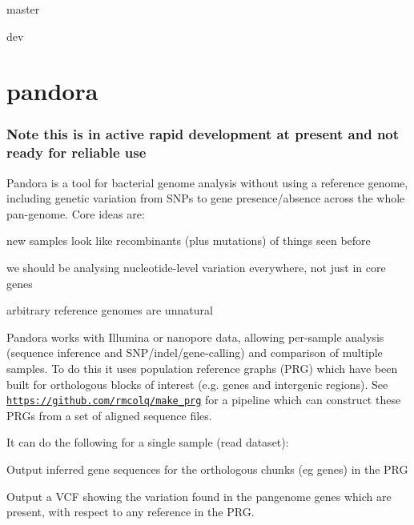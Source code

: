 \href{https://travis-ci.org/rmcolq/pandora}{\tt } master

\href{https://travis-ci.com/rmcolq/pandora}{\tt } dev

\href{https://singularity-hub.org/collections/1285}{\tt }

\section*{pandora}

\subsubsection*{Note this is in active rapid development at present and not ready for reliable use}

Pandora is a tool for bacterial genome analysis without using a reference genome, including genetic variation from S\+N\+Ps to gene presence/absence across the whole pan-\/genome. Core ideas are\+:
\begin{DoxyItemize}
\item new samples look like recombinants (plus mutations) of things seen before
\item we should be analysing nucleotide-\/level variation everywhere, not just in core genes
\item arbitrary reference genomes are unnatural
\end{DoxyItemize}

Pandora works with Illumina or nanopore data, allowing per-\/sample analysis (sequence inference and S\+N\+P/indel/gene-\/calling) and comparison of multiple samples. To do this it uses population reference graphs (P\+RG) which have been built for orthologous blocks of interest (e.\+g. genes and intergenic regions). See \href{https://github.com/rmcolq/make_prg}{\tt https\+://github.\+com/rmcolq/make\+\_\+prg} for a pipeline which can construct these P\+R\+Gs from a set of aligned sequence files.

It can do the following for a single sample (read dataset)\+:


\begin{DoxyItemize}
\item Output inferred gene sequences for the orthologous chunks (eg genes) in the P\+RG
\item Output a V\+CF showing the variation found in the pangenome genes which are present, with respect to any reference in the P\+RG.
\end{DoxyItemize}

